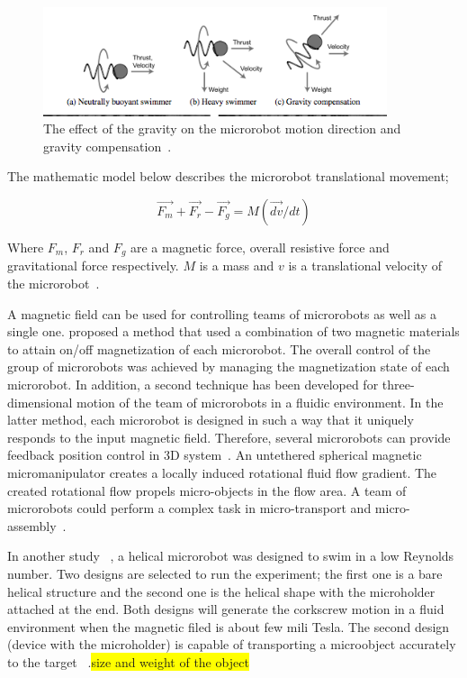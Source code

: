 \documentclass[12pt,a4paper,titlepage]{report}
\newcommand{\hilight}[1]{\colorbox{yellow}{#1}}
\begin{document}
\begin{figure}
  \centering
    \includegraphics[width=0.9\textwidth]{11}
  \caption{The effect of the gravity on the microrobot motion direction and gravity compensation~\citep{mahoney2011velocity}.}
  \label{11}
\end{figure}


The mathematic model below describes the microrobot translational movement;

\begin{equation}
  \overrightarrow{F_m }+ \overrightarrow{F_r} - \overrightarrow{F_g} = M(\overrightarrow{dv}/dt)
\label{eq:4}
\end{equation}

Where $F_m$, $F_r$ and $F_g$ are a magnetic force, overall resistive force and gravitational force respectively. 
$M$ is a mass and $v$ is a translational velocity of the microrobot~\citep{kim2013fabrication}. 

A magnetic field can be used for controlling teams of microrobots as well as a single 
one. \citeauthor{kim2013fabrication} proposed a method that used a combination of two magnetic materials to 
attain on/off magnetization of each microrobot. The overall control of the group of microrobots 
was achieved by managing the magnetization state of each microrobot. In addition, a second technique has been 
developed for three-dimensional motion of the team of microrobots in a fluidic environment. In
 the latter method, each microrobot is designed in such a way that it uniquely responds to the 
input magnetic field. Therefore, several microrobots can provide feedback position control in 
3D system~\citep{kim2013fabrication}.
An untethered spherical magnetic micromanipulator creates a locally induced rotational fluid flow gradient. 
The created rotational flow propels micro-objects in the flow area. A team of microrobots could perform
 a complex task in micro-transport and micro-assembly~\citep{kim2013fabrication}.

In another study ~\citep{tottori2012magnetic}, a helical microrobot was designed to swim in a low Reynolds number. 
Two designs are selected to run the experiment;  the first one is a bare helical structure and the second one is the
 helical shape with the microholder attached at the end. Both designs will generate the corkscrew
 motion in a fluid environment when the magnetic filed is about few mili Tesla. The second 
design (device with the microholder) is capable of transporting a microobject accurately to the 
target ~\citep{tottori2012magnetic}.\hilight{size and weight of the object}
\end{document}
